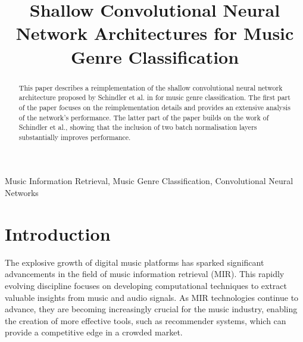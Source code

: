 \documentclass[conference]{IEEEtran}
\begin{document}

\title{Shallow Convolutional Neural Network Architectures for Music Genre Classification}

\author{
}

\maketitle

\begin{abstract}
This paper describes a reimplementation of the shallow convolutional neural network architecture proposed by Schindler et al. in \cite{SchindlerLidyRauber} for music genre classification.
The first part of the paper focuses on the reimplementation details and provides an extensive analysis of the network's performance.
The latter part of the paper builds on the work of Schindler et al., showing that the inclusion of two batch normalisation layers substantially improves performance.
\end{abstract}

\begin{IEEEkeywords}
Music Information Retrieval, Music Genre Classification, Convolutional Neural Networks
\end{IEEEkeywords}

\section{Introduction}

The explosive growth of digital music platforms has sparked significant advancements in the field of music information retrieval (MIR).
This rapidly evolving discipline focuses on developing computational techniques to extract valuable insights from music and audio signals.
As MIR technologies continue to advance, they are becoming increasingly crucial for the music industry, enabling the creation of more effective tools, such as recommender systems, which can provide a competitive edge in a crowded market.
\end{document}
